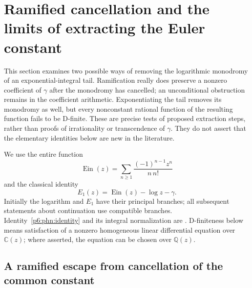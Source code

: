 \documentclass[11pt,a4paper]{article}
\theoremstyle{definition}
\theoremstyle{remark}
\numberwithin{equation}{section}
\begin{document}
\section{Ramified cancellation and the limits of extracting the Euler constant}
\label{p6:phn:section}

This section examines two possible ways of removing the logarithmic
monodromy of an exponential-integral tail.  Ramification really does
preserve a nonzero coefficient of $\gamma$ after the monodromy has
cancelled; an unconditional obstruction remains in the coefficient
arithmetic.  Exponentiating the tail removes its monodromy as well,
but every nonconstant rational function of the resulting function
fails to be D-finite.  These are precise tests of proposed extraction
steps, rather than proofs of irrationality or transcendence of $\gamma$.
They do not assert that the elementary identities below are new in the
literature.

We use the entire function
\[
 \operatorname{Ein}(z)=\sum_{n\geq1}\frac{(-1)^{n-1}z^n}{n\,n!}
\]
and the classical identity
\begin{equation}\label{p6:phn:identity}
 E_1(z)=\operatorname{Ein}(z)-\log z-\gamma.
\end{equation}
Initially the logarithm and $E_1$ have their principal branches; all
subsequent statements about continuation use compatible branches.
Identity~\eqref{p6:phn:identity} and its integral normalization are
\cite[\S6.2, equations (6.2.1), (6.2.3), (6.2.4)]{p6:DLMF}.
D-finiteness below means satisfaction of a nonzero homogeneous linear
differential equation over $\mathbb C(z)$; where asserted, the equation
can be chosen over $\mathbb Q(z)$.

\subsection{A ramified escape from cancellation of the common constant}
\end{document}
